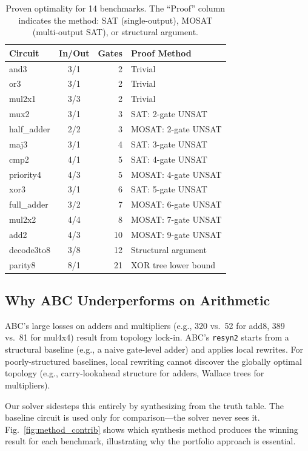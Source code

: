 \documentclass[conference,10pt]{IEEEtran}
\begin{document}
\begin{table}[t]
\centering
\caption{Proven optimality for 14 benchmarks. The ``Proof'' column indicates the method: SAT (single-output), MOSAT (multi-output SAT), or structural argument.}
\label{tab:optimal}
\footnotesize
\begin{tabular}{@{}lcrl@{}}
\toprule
\textbf{Circuit} & \textbf{In/Out} & \textbf{Gates} & \textbf{Proof Method} \\
\midrule
and3         & 3/1 &  2 & Trivial \\
or3          & 3/1 &  2 & Trivial \\
mul2x1       & 3/3 &  2 & Trivial \\
mux2         & 3/1 &  3 & SAT: 2-gate UNSAT \\
half\_adder  & 2/2 &  3 & MOSAT: 2-gate UNSAT \\
maj3         & 3/1 &  4 & SAT: 3-gate UNSAT \\
cmp2         & 4/1 &  5 & SAT: 4-gate UNSAT \\
priority4    & 4/3 &  5 & MOSAT: 4-gate UNSAT \\
xor3         & 3/1 &  6 & SAT: 5-gate UNSAT \\
full\_adder  & 3/2 &  7 & MOSAT: 6-gate UNSAT \\
mul2x2       & 4/4 &  8 & MOSAT: 7-gate UNSAT \\
add2         & 4/3 & 10 & MOSAT: 9-gate UNSAT \\
decode3to8   & 3/8 & 12 & Structural argument \\
parity8      & 8/1 & 21 & XOR tree lower bound \\
\bottomrule
\end{tabular}
\end{table}

\subsection{Why ABC Underperforms on Arithmetic}

ABC's large losses on adders and multipliers (e.g., 320 vs.\ 52 for add8, 389 vs.\ 81 for mul4x4) result from topology lock-in. ABC's \texttt{resyn2} starts from a structural baseline (e.g., a naive gate-level adder) and applies local rewrites. For poorly-structured baselines, local rewriting cannot discover the globally optimal topology (e.g., carry-lookahead structure for adders, Wallace trees for multipliers).

Our solver sidesteps this entirely by synthesizing from the truth table. The baseline circuit is used only for comparison---the solver never sees it. Fig.~\ref{fig:method_contrib} shows which synthesis method produces the winning result for each benchmark, illustrating why the portfolio approach is essential.
\end{document}
